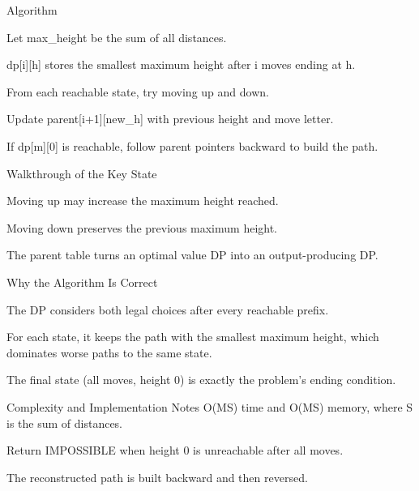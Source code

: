 \documentclass[aspectratio=169,11pt]{beamer}
\begin{document}
\begin{frame}{Algorithm}
\begin{tightitemize}
  \item Let max\_height be the sum of all distances.
  \item dp[i][h] stores the smallest maximum height after i moves ending at h.
  \item From each reachable state, try moving up and down.
  \item Update parent[i+1][new\_h] with previous height and move letter.
  \item If dp[m][0] is reachable, follow parent pointers backward to build the path.
\end{tightitemize}
\end{frame}

\begin{frame}{Walkthrough of the Key State}
\begin{tightitemize}
  \item Moving up may increase the maximum height reached.
  \item Moving down preserves the previous maximum height.
  \item The parent table turns an optimal value DP into an output-producing DP.
\end{tightitemize}
\end{frame}

\begin{frame}{Why the Algorithm Is Correct}
\begin{tightitemize}
  \item The DP considers both legal choices after every reachable prefix.
  \item For each state, it keeps the path with the smallest maximum height, which dominates worse paths to the same state.
  \item The final state (all moves, height 0) is exactly the problem's ending condition.
\end{tightitemize}
\end{frame}

\begin{frame}{Complexity and Implementation Notes}
\small
{} O(MS) time and O(MS) memory, where S is the sum of distances.

\vspace{0.3cm}
\begin{tightitemize}
  \item Return IMPOSSIBLE when height 0 is unreachable after all moves.
  \item The reconstructed path is built backward and then reversed.
\end{tightitemize}
\end{frame}
\end{document}
